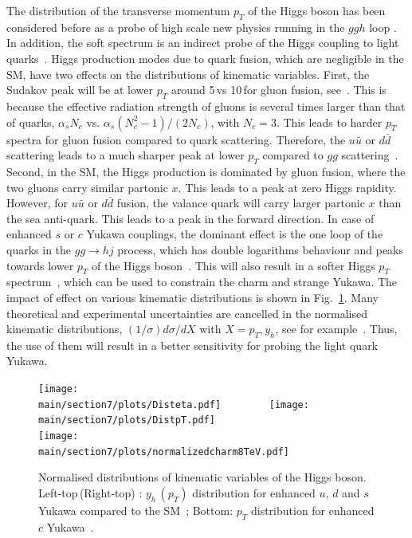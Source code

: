 \documentclass[../report.tex]{subfiles}
\providecommand{\main}{..}
\begin{document}
The distribution of the transverse momentum $p_T$ of the Higgs boson has been considered before as a probe of high scale new physics running in the $ggh$ loop \cite{Arnesen:2008fb,Biekotter:2016ecg,Brehmer:2015rna,Dawson:2015gka,Schlaffer:2014osa,Grojean:2013nya,Langenegger:2015lra,Bramante:2014hua,Buschmann:2014twa,Azatov:2013xha,Banfi:2013yoa,Buschmann:2014sia}. 
In addition, the soft spectrum is an indirect probe of the Higgs coupling to light quarks~\cite{Soreq:2016rae,Bishara:2016jga}. 
Higgs production modes due to quark fusion, which are negligible in the SM, have two effects on the distributions of kinematic variables. 
%
First, the Sudakov peak will be at lower $p_T$ around 5\,\UGeV vs 10\,\UGeV for gluon fusion, see~\cite{Collins:1984kg}. This is because the effective radiation strength of gluons is several times larger than that of quarks, $\alpha_s N_c$ vs. $\alpha_s (N^2_c-1)/(2N_c)$, with $N_c=3$. This leads to harder $p_T$ spectra for gluon fusion compared to quark scattering. 
Therefore, the $u\bar{u}$ or $d\bar{d}$ scattering leads to a much sharper peak at lower $p_T$ compared to  $gg$ scattering~\cite{Soreq:2016rae}.
Second, in the SM, the Higgs production is dominated by  gluon fusion, where the two gluons carry similar partonic $x$. This leads to a peak at zero Higgs rapidity. However, for $u\bar u$ or $d\bar d$ fusion, the valance quark will carry larger partonic $x$ than the sea anti-quark. This leads to a peak in the forward direction. 
%
In case of enhanced $s$ or $c$ Yukawa couplings, the dominant effect is the one loop of the quarks in the $gg\to hj$ process, which has double logarithms behaviour and peaks towards lower $p_T$ of the Higgs boson~\cite{Baur:1989cm}. This will also result in a softer Higgs $p_T$ spectrum~\cite{Bishara:2016jga}, which can be used to constrain the charm and strange Yukawa. 
%
The impact of effect on various kinematic distributions is shown in Fig.~\ref{fig:HiggsDist}. 
Many theoretical and experimental uncertainties are cancelled in  the normalised kinematic distributions, $(1/\sigma)d\sigma/dX$ with $X=p_T, y_h$, see for example~\cite{Soreq:2016rae}.
Thus, the use of them will result in a better sensitivity for probing the light quark Yukawa. 
\begin{figure}[t]
\begin{center}
\texttt{[image: \\main/section7/plots/Disteta.pdf]}~~~~~~~~
\texttt{[image: \\main/section7/plots/DistpT.pdf]}\\
\texttt{[image: \\main/section7/plots/normalizedcharm8TeV.pdf]}
\caption{Normalised distributions of kinematic variables of the Higgs boson. 
Left-top\,(Right-top) : $y_h\,(p_T)$ distribution for enhanced $u$, $d$ and $s$ Yukawa compared to the SM~\cite{Soreq:2016rae};
Bottom: $p_T$ distribution for enhanced $c$ Yukawa~\cite{Bishara:2016jga}. 
}
\label{fig:HiggsDist}
\end{center}
\end{figure}
\end{document}

